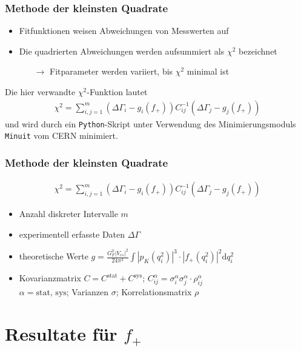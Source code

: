 \documentclass[hyperref={pdfpagelabels=false}]{beamer}
\begin{document}
\begin{frame}
 \frametitle{Methode der kleinsten Quadrate}
 \begin{itemize}
  \item Fitfunktionen weisen Abweichungen von Messwerten auf
  \item Die quadrierten Abweichungen werden aufsummiert als $\chi^2$ bezeichnet
  \begin{itemize}
   \item [$\rightarrow$] Fitparameter werden variiert, bis $\chi^2$ minimal ist
  \end{itemize}
 \end{itemize}
 Die hier verwandte $\chi^2$-Funktion lautet
 \begin{align*}
  \chi^2 = \sum\limits_{i,j=1}^m (\Delta \Gamma_i - g_i(f_+))C^{-1}_{ij}(\Delta \Gamma_j - g_j(f_+))
 \end{align*} 
 und wird durch ein \texttt{Python}-Skript unter Verwendung des Minimierungsmoduls \texttt{Minuit} vom CERN minimiert.
\end{frame}

\begin{frame}
 \frametitle{Methode der kleinsten Quadrate}
  \begin{align*}
  \chi^2 = \sum\limits_{i,j=1}^m (\Delta \Gamma_i - g_i(f_+))C^{-1}_{ij}(\Delta \Gamma_j - g_j(f_+))
 \end{align*}
 \begin{itemize}
  \item Anzahl diskreter Intervalle $m$
  \item experimentell erfasste Daten $\Delta \Gamma$
  \item theoretische Werte $g = \frac{G_F^2 |V_{cs}|^2}{24\pi^3}\int|p_K(q_i^2)|^3 \cdot |f_+(q^2_i)|^2 \mathrm{d} q_i^2$
  \item Kovarianzmatrix $C = C^{\text{stat}} + C^{\text{sys}}$; $C^{\alpha}_{ij} = \sigma^{\alpha}_i \sigma^{\alpha}_j \cdot \rho^{\alpha}_{ij}$\\ 
  $\alpha = \text{stat, sys}$; Varianzen $\sigma$; Korrelationsmatrix $\rho$  
 \end{itemize}
\end{frame}





\section{Resultate für $f_+$}
\begin{frame}
\tableofcontents[currentsection]
\end{frame}
\end{document}
